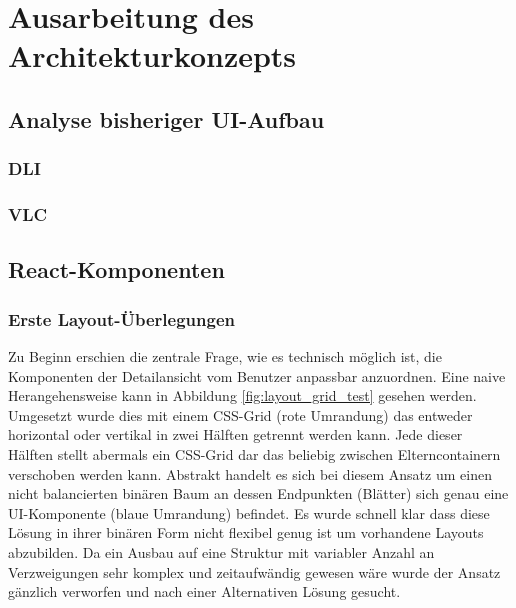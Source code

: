 \chapter{Ausarbeitung des Architekturkonzepts}
\label{chap:concept}
\section{Analyse bisheriger UI-Aufbau}
\subsection{DLI}
\subsection{VLC}

\section{React-Komponenten}
\subsection{Erste Layout-Überlegungen}
Zu Beginn erschien die zentrale Frage, wie  es technisch möglich ist, die Komponenten der Detailansicht vom Benutzer anpassbar anzuordnen. Eine naive Herangehensweise kann in Abbildung \ref{fig:layout_grid_test} gesehen werden. Umgesetzt wurde dies mit einem CSS-Grid (rote Umrandung) das entweder horizontal oder vertikal in zwei Hälften getrennt werden kann. Jede dieser Hälften stellt abermals ein CSS-Grid dar das beliebig zwischen Elterncontainern verschoben werden kann. Abstrakt handelt es sich bei diesem Ansatz um einen nicht balancierten binären Baum an dessen Endpunkten (Blätter) sich genau eine UI-Komponente (blaue Umrandung) befindet. Es wurde schnell klar dass diese Lösung in ihrer binären Form nicht flexibel genug ist um vorhandene Layouts abzubilden. Da ein Ausbau auf eine Struktur mit variabler Anzahl an Verzweigungen sehr komplex und zeitaufwändig gewesen wäre wurde der Ansatz gänzlich verworfen und nach einer Alternativen Lösung gesucht. 

